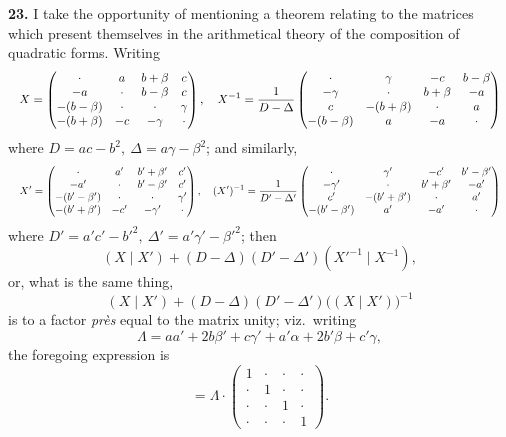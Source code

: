 \documentclass[11pt]{article}
\begin{document}
\textbf{23.} I take the opportunity of mentioning a theorem relating to the matrices which present themselves in the arithmetical theory of the composition of quadratic forms. Writing
\[
\resizebox{\textwidth}{!}{$\displaystyle
X = \begin{pmatrix} \cdot & a & b + \beta & c \\ -a & \cdot & b - \beta & c \\ -(b - \beta) & \cdot & \cdot & \gamma \\ -(b + \beta) & -c & -\gamma & \cdot \end{pmatrix},\quad
X^{-1} = \frac{1}{D - \Delta}\begin{pmatrix} \cdot & \gamma & -c & b - \beta \\ -\gamma & \cdot & b + \beta & -a \\ c & -(b + \beta) & \cdot & a \\ -(b - \beta) & a & -a & \cdot \end{pmatrix}
$}
\]
where $D = ac - b^{2},\ \Delta = a\gamma - \beta^{2}$; and similarly,
\[
\resizebox{\textwidth}{!}{$\displaystyle
X' = \begin{pmatrix} \cdot & a' & b' + \beta' & c' \\ -a' & \cdot & b' - \beta' & c' \\ -(b' - \beta') & \cdot & \cdot & \gamma' \\ -(b' + \beta') & -c' & -\gamma' & \cdot \end{pmatrix},\quad
(X')^{-1} = \frac{1}{D' - \Delta'}\begin{pmatrix} \cdot & \gamma' & -c' & b' - \beta' \\ -\gamma' & \cdot & b' + \beta' & -a' \\ c' & -(b' + \beta') & \cdot & a' \\ -(b' - \beta') & a' & -a' & \cdot \end{pmatrix}
$}
\]
where $D' = a' c' - b'^{2},\ \Delta' = a' \gamma' - \beta'^{2}$; then
\[
(X \mid X') + (D - \Delta)(D' - \Delta')(X'^{-1} \mid X^{-1}),
\]
or, what is the same thing,
\[
(X \mid X') + (D - \Delta)(D' - \Delta')\bigl((X \mid X')\bigr)^{-1}
\]
is to a factor \textit{pr\`es} equal to the matrix unity; viz.\ writing
\[
\Lambda = a a' + 2 b \beta' + c \gamma' + a' \alpha + 2 b' \beta + c' \gamma,
\]
the foregoing expression is
\[
= \Lambda \cdot \begin{pmatrix} 1 & \cdot & \cdot & \cdot \\ \cdot & 1 & \cdot & \cdot \\ \cdot & \cdot & 1 & \cdot \\ \cdot & \cdot & \cdot & 1 \end{pmatrix}.
\]
\end{document}
